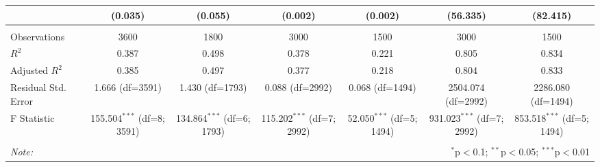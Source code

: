 \begin{table}[!htbp]
\begin{tabular}{@{\extracolsep{5pt}}lcccccc}
& (0.035) & (0.055) & (0.002) & (0.002) & (56.335) & (82.415) \\
\hline \\[-1.8ex]
 Observations & 3600 & 1800 & 3000 & 1500 & 3000 & 1500 \\
 $R^2$ & 0.387 & 0.498 & 0.378 & 0.221 & 0.805 & 0.834 \\
 Adjusted $R^2$ & 0.385 & 0.497 & 0.377 & 0.218 & 0.804 & 0.833 \\
 Residual Std. Error & 1.666 (df=3591) & 1.430 (df=1793) & 0.088 (df=2992) & 0.068 (df=1494) & 2504.074 (df=2992) & 2286.080 (df=1494) \\
 F Statistic & 155.504$^{***}$ (df=8; 3591) & 134.864$^{***}$ (df=6; 1793) & 115.202$^{***}$ (df=7; 2992) & 52.050$^{***}$ (df=5; 1494) & 931.023$^{***}$ (df=7; 2992) & 853.518$^{***}$ (df=5; 1494) \\
\hline
\hline \\[-1.8ex]
\textit{Note:} & \multicolumn{6}{r}{$^{*}$p$<$0.1; $^{**}$p$<$0.05; $^{***}$p$<$0.01} \\
\end{tabular}
\end{table}
